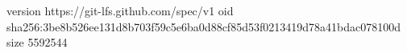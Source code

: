 version https://git-lfs.github.com/spec/v1
oid sha256:3be8b526ee131d8b703f59c5e6ba0d88cf85d53f0213419d78a41bdac078100d
size 5592544
